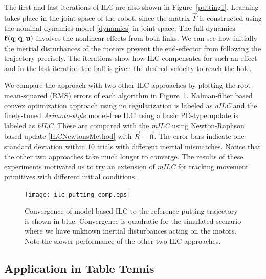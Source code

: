 The first and last iterations of ILC are also shown in Figure~\ref{putting1}. Learning takes place in the joint space of the robot, since the matrix $\vec{F}$ is constructed using the nominal dynamics model \eqref{dynamics} in joint space. The full dynamics $\boldsymbol{\mathrm{f}}(\boldsymbol{\mathrm{q}},\dot{\boldsymbol{\mathrm{q}}},\boldsymbol{\mathrm{u}})$ involves the nonlinear effects from both links. We can see how initially the inertial disturbances of the motors prevent the end-effector from following the trajectory precisely. The iterations show how ILC compensates for such an effect and in the last iteration the ball is given the desired velocity to reach the hole. 

We compare the approach with two other ILC approaches by plotting the root-mean-squared (RMS) errors of each algorithm in Figure~\ref{ILCTrajectoryPutting}. Kalman-filter based convex optimization approach \cite{Schoellig12} using no regularization is labeled as \emph{aILC} and the finely-tuned \emph{Arimoto-style} \cite{Arimoto84} model-free ILC using a basic PD-type update is labeled as \emph{bILC}. These are compared with the \emph{mILC} using Newton-Raphson based update \eqref{ILCNewtonsMethod} with $\vec{R} = \vec{0}$. The error bars indicate one standard deviation within $10$ trials with different inertial mismatches. Notice that the other two approaches take much longer to converge. The results of these experiments motivated us to try an extension of \emph{mILC} for tracking movement primitives with different initial conditions.

\begin{figure}
\centering
\texttt{[image: ilc\_putting\_comp.eps]}
\caption{Convergence of model based ILC to the reference putting trajectory is shown in blue. Convergence is quadratic for the simulated scenario where we have unknown inertial disturbances acting on the motors. Note the slower performance of the other two ILC approaches.}
\label{ILCTrajectoryPutting}
\end{figure}


\subsection{Application in Table Tennis}


